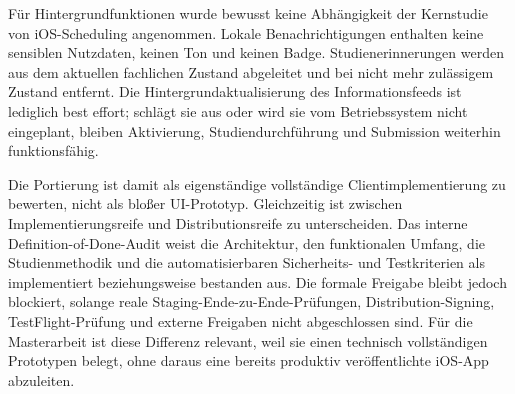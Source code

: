 \begin{neu}
Für Hintergrundfunktionen wurde bewusst keine Abhängigkeit der Kernstudie von iOS-Scheduling angenommen. Lokale Benachrichtigungen enthalten keine sensiblen Nutzdaten, keinen Ton und keinen Badge. Studienerinnerungen werden aus dem aktuellen fachlichen Zustand abgeleitet und bei nicht mehr zulässigem Zustand entfernt. Die Hintergrundaktualisierung des Informationsfeeds ist lediglich best effort; schlägt sie aus oder wird sie vom Betriebssystem nicht eingeplant, bleiben Aktivierung, Studiendurchführung und Submission weiterhin funktionsfähig.

Die Portierung ist damit als eigenständige vollständige Clientimplementierung zu bewerten, nicht als bloßer UI-Prototyp. Gleichzeitig ist zwischen Implementierungsreife und Distributionsreife zu unterscheiden. Das interne Definition-of-Done-Audit weist die Architektur, den funktionalen Umfang, die Studienmethodik und die automatisierbaren Sicherheits- und Testkriterien als implementiert beziehungsweise bestanden aus. Die formale Freigabe bleibt jedoch blockiert, solange reale Staging-Ende-zu-Ende-Prüfungen, Distribution-Signing, TestFlight-Prüfung und externe Freigaben nicht abgeschlossen sind. Für die Masterarbeit ist diese Differenz relevant, weil sie einen technisch vollständigen Prototypen belegt, ohne daraus eine bereits produktiv veröffentlichte iOS-App abzuleiten.
\end{neu}

